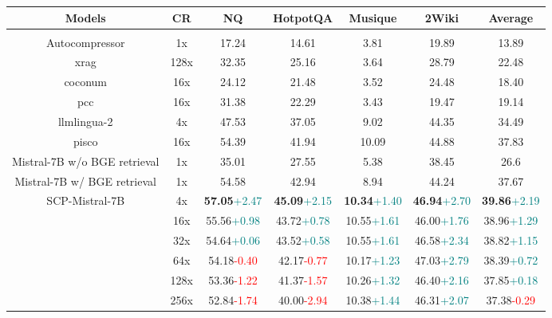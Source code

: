 \documentclass{applemlr}
\numberwithin{equation}{section}
\begin{document}
\begin{table}[!t]
\footnotesize
\centering
\begin{tabular}{ccccccc}
\bottomrule
Models & CR & NQ & HotpotQA & Musique & 2Wiki & Average \\
\hline
\rowcolor{gray!15}
\multicolumn{7}{c}{\textbf{Normal}} \\
\hline
Autocompressor & 1x & 17.24 & 14.61 & 3.81 & 19.89 & 13.89 \\
xrag & 128x & 32.35 & 25.16 & 3.64 & 28.79 & 22.48 \\
coconum & 16x & 24.12 & 21.48 & 3.52 & 24.48 & 18.40 \\
pcc & 16x & 31.38 & 22.29 & 3.43 & 19.47 & 19.14 \\
llmlingua-2 & 4x & 47.53 & 37.05 & 9.02 & 44.35 & 34.49 \\
pisco & 16x & 54.39 & 41.94 & 10.09 & 44.88 & 37.83 \\
\hline
Mistral-7B w/o BGE retrieval & 1x & 35.01 & 27.55 & 5.38 & 38.45 & 26.6 \\
Mistral-7B w/ BGE retrieval & 1x & 54.58 & 42.94 & 8.94 & 44.24 & 37.67 \\
\multirow{6}{*}{SCP-Mistral-7B }& 4x & \textbf{57.05}\tiny\textcolor{teal}{+2.47} & \textbf{45.09}\tiny\textcolor{teal}{+2.15} & \textbf{10.34}\tiny\textcolor{teal}{+1.40} & \textbf{46.94}\tiny\textcolor{teal}{+2.70} & \textbf{39.86}\tiny\textcolor{teal}{+2.19} \\
 & 16x & 55.56\tiny\textcolor{teal}{+0.98} & 43.72\tiny\textcolor{teal}{+0.78} & 10.55\tiny\textcolor{teal}{+1.61} & 46.00\tiny\textcolor{teal}{+1.76} & 38.96\tiny\textcolor{teal}{+1.29} \\
 & 32x & 54.64\tiny\textcolor{teal}{+0.06} & 43.52\tiny\textcolor{teal}{+0.58} & 10.55\tiny\textcolor{teal}{+1.61} & 46.58\tiny\textcolor{teal}{+2.34} & 38.82\tiny\textcolor{teal}{+1.15} \\
 & 64x & 54.18\tiny\textcolor{red}{-0.40} & 42.17\tiny\textcolor{red}{-0.77} & 10.17\tiny\textcolor{teal}{+1.23} & 47.03\tiny\textcolor{teal}{+2.79} & 38.39\tiny\textcolor{teal}{+0.72} \\
 & 128x & 53.36\tiny\textcolor{red}{-1.22} & 41.37\tiny\textcolor{red}{-1.57} & 10.26\tiny\textcolor{teal}{+1.32} & 46.40\tiny\textcolor{teal}{+2.16} & 37.85\tiny\textcolor{teal}{+0.18} \\
 & 256x & 52.84\tiny\textcolor{red}{-1.74} & 40.00\tiny\textcolor{red}{-2.94} & 10.38\tiny\textcolor{teal}{+1.44} & 46.31\tiny\textcolor{teal}{+2.07} & 37.38\tiny\textcolor{red}{-0.29} \\

\end{tabular}
\end{table}
\end{document}
